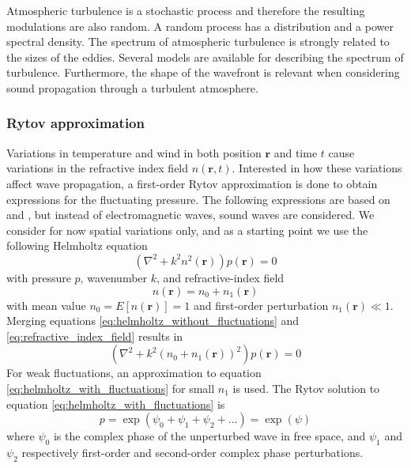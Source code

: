 Atmospheric turbulence is a stochastic process and therefore the resulting modulations are
also random. A random process has a distribution and a power spectral density.
The spectrum of atmospheric turbulence is strongly related to the sizes of the eddies.
Several models are available for describing the spectrum of turbulence.
Furthermore, the shape of the wavefront is relevant when considering sound
propagation through a turbulent atmosphere.


\subsubsection*{Rytov approximation}
Variations in temperature and wind in both position $\mathbf{r}$ and time $t$
cause variations in the refractive index field $n(\mathbf{r},t)$.
Interested in how these variations affect wave propagation, a first-order Rytov approximation is done to obtain expressions for the fluctuating pressure.
The following expressions are based on \cite{Ishimaru1997} and \cite{Jurado-navas2006}, but instead of electromagnetic
waves, sound waves are considered. We consider for now spatial variations only, and
as a starting point we use the following Helmholtz equation
\begin{equation}\label{eq:helmholtz_without_fluctuations}
 \left( \nabla^2 + k^2 n^2(\mathbf{r}) \right) p(\mathbf{r})= 0
\end{equation}
with pressure $p$, wavenumber $k$, and refractive-index field
\begin{equation}\label{eq:refractive_index_field}
 n(\mathbf{r}) = n_0 + n_1(\mathbf{r})
\end{equation}
with mean value $n_0 = E[n(\mathbf{r})] = 1$ and first-order perturbation $n_1(\mathbf{r}) \ll 1$. Merging equations \eqref{eq:helmholtz_without_fluctuations} and \eqref{eq:refractive_index_field} results in
\begin{equation}\label{eq:helmholtz_with_fluctuations}
 \left( \nabla^2 + k^2 (n_0 + n_1(\mathbf{r}))^2 \right) p(\mathbf{r}) = 0
\end{equation}
For weak fluctuations, an approximation to equation \eqref{eq:helmholtz_with_fluctuations} for small $n_1$ is used.
The Rytov solution to equation \eqref{eq:helmholtz_with_fluctuations} is
\begin{equation}
 p = \exp{\left(\psi_0 + \psi_1 + \psi_2 + \dots \right)} = \exp{(\psi)}
\end{equation}
where $\psi_0$ is the complex phase of the unperturbed wave in free space, and $\psi_1$ and $\psi_2$ respectively first-order and second-order complex phase perturbations.

